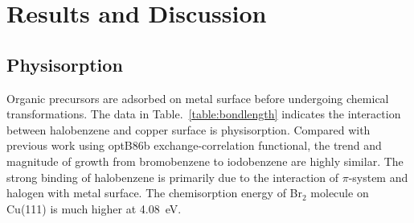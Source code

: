 \documentclass[%
 reprint,
 amsmath,amssymb,
 aps,
prb,
floatfix,
]{revtex4-2}
\begin{document}
\section{Results and Discussion}


\subsection{Physisorption}

{\color{blue}
Organic precursors are adsorbed on metal surface before undergoing chemical transformations. 
The data in Table.~\ref{table:bondlength} indicates the interaction between halobenzene and copper surface is physisorption. Compared with previous work using optB86b exchange-correlation functional, the trend and magnitude of growth from bromobenzene to iodobenzene are highly similar. The strong binding of halobenzene is primarily due to the interaction of $\pi$-system and halogen with metal surface. The chemisorption energy of Br$_2$ molecule on Cu(111) is much higher at \SI{4.08}{\electronvolt}.




}
\end{document}
